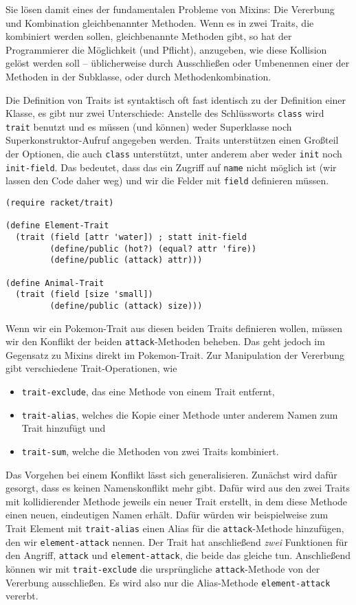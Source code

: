 Sie lösen damit eines der fundamentalen Probleme von Mixins: Die Vererbung und Kombination gleichbenannter Methoden. Wenn es in zwei Traits, die kombiniert werden sollen, gleichbenannte Methoden gibt, so hat der Programmierer die Möglichkeit (und Pflicht), anzugeben, wie diese Kollision gelöst werden soll -- üblicherweise durch Ausschließen oder Umbenennen einer der Methoden in der Subklasse, oder durch Methodenkombination.

Die Definition von Traits ist syntaktisch oft fast identisch zu der Definition einer Klasse, es gibt nur zwei Unterschiede: Anstelle des Schlüssworts \texttt{class} wird \texttt{trait} benutzt und es müssen (und können) weder Superklasse noch Superkonstruktor-Aufruf angegeben werden. Traits unterstützen einen Großteil der Optionen, die auch \texttt{class} unterstützt, unter anderem aber weder \texttt{init} noch \texttt{init-field}. Das bedeutet, dass das ein Zugriff auf \texttt{name} nicht möglich ist (wir lassen den Code daher weg) und wir die Felder mit \texttt{field} definieren müssen.

\begin{lstlisting}
(require racket/trait)

(define Element-Trait
  (trait (field [attr 'water]) ; statt init-field
         (define/public (hot?) (equal? attr 'fire))
         (define/public (attack) attr)))

(define Animal-Trait
  (trait (field [size 'small])
         (define/public (attack) size)))
\end{lstlisting}

Wenn wir ein Pokemon-Trait aus diesen beiden Traits definieren wollen, müssen wir den Konflikt der beiden \texttt{attack}-Methoden beheben. Das geht jedoch im Gegensatz zu Mixins direkt im Pokemon-Trait. Zur Manipulation der Vererbung gibt verschiedene Trait-Operationen, wie
\begin{itemize}
 \item \texttt{trait-exclude}, das eine Methode von einem Trait entfernt,
 \item \texttt{trait-alias}, welches die Kopie einer Methode unter anderem Namen zum Trait hinzufügt und
 \item \texttt{trait-sum}, welche die Methoden von zwei Traits kombiniert.
\end{itemize}

Das Vorgehen bei einem Konflikt lässt sich generalisieren. Zunächst wird dafür gesorgt, dass es keinen Namenskonflikt mehr gibt. Dafür wird aus den zwei Traits mit kollidierender Methode jeweils ein neuer Trait erstellt, in dem diese Methode einen neuen, eindeutigen Namen erhält. Dafür würden wir beispielweise zum Trait Element mit \texttt{trait-alias} einen Alias für die \texttt{attack}-Methode hinzufügen, den wir \texttt{element-attack} nennen. Der Trait hat anschließend \emph{zwei} Funktionen für den Angriff, \texttt{attack} und \texttt{element-attack}, die beide das gleiche tun. Anschließend können wir mit \texttt{trait-exclude} die ursprüngliche \texttt{attack}-Methode von der Vererbung ausschließen. Es wird also nur die Alias-Methode \texttt{element-attack} vererbt.

